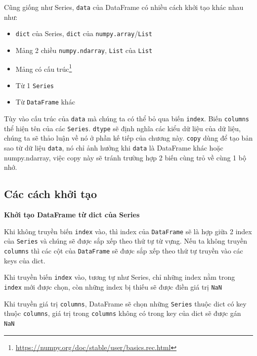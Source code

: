 \documentclass[
]{book}
\providecommand{\tightlist}{%
  \setlength{\itemsep}{0pt}\setlength{\parskip}{0pt}}
\renewcommand{\href}[2]{#2\footnote{\url{#1}}}
\begin{document}
Cũng giống như Series, \texttt{data} của DataFrame có nhiều cách khởi tạo khác nhau như:

\begin{itemize}
\tightlist
\item
  \texttt{dict} của Series, \texttt{dict} của \texttt{numpy.array}/\texttt{List}
\item
  Mảng 2 chiều \texttt{numpy.ndarray}, \texttt{List} của \texttt{List}
\item
  \href{https://numpy.org/doc/stable/user/basics.rec.html}{Mảng có cấu trúc}
\item
  Từ 1 \texttt{Series}
\item
  Từ \texttt{DataFrame} khác
\end{itemize}

Tùy vào cấu trúc của \texttt{data} mà chúng ta có thể bỏ qua biến \texttt{index}. Biến \texttt{columns} thể hiện tên
của các \texttt{Series}. \texttt{dtype} sẽ định nghĩa các kiểu dữ liệu của dữ liệu, chúng ta sẽ thảo luận về nó
ở phần kế tiếp của chương này. \texttt{copy} dùng để tạo bản sao từ dữ liệu \texttt{data}, nó chỉ ảnh hưởng khi
\texttt{data} là DataFrame khác hoặc numpy.ndarray, việc copy này sẽ tránh trường hợp 2 biến cùng trỏ về
cùng 1 bộ nhớ.

\subsection{Các cách khởi tạo}\label{cuxe1c-cuxe1ch-khux1edfi-tux1ea1o-1}

\textbf{Khởi tạo DataFrame từ dict của Series}

Khi không truyền biến \texttt{index} vào, thì index của \texttt{DataFrame} sẽ là hợp giữa 2 index của \texttt{Series} và
chúng sẽ được sắp xếp theo thứ tự từ vựng. Nếu ta không truyền \texttt{columns} thì các cột của \texttt{DataFrame} sẽ
được sắp xếp theo thứ tự truyền vào các keys của dict.

Khi truyền biến \texttt{index} vào, tương tự như Series, chỉ những index nằm trong \texttt{index} mới được chọn, còn
những index bị thiếu sẽ được điền giá trị \texttt{NaN}

Khi truyền giá trị \texttt{columns}, DataFrame sẽ chọn những \texttt{Series} thuộc dict có key thuộc \texttt{columns}, giá trị
trong \texttt{columns} không có trong key của dict sẽ được gán \texttt{NaN}
\end{document}
